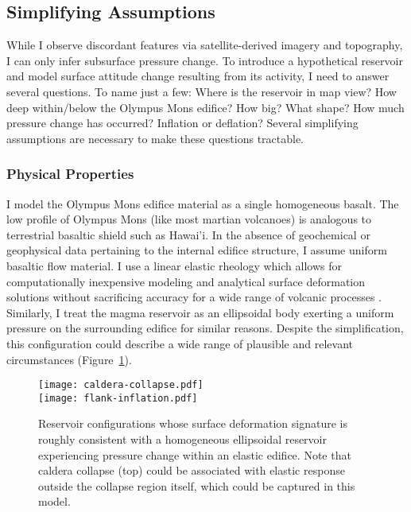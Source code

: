 \subsection{Simplifying Assumptions}

While I observe discordant features via satellite-derived imagery and topography, I can only infer subsurface pressure change. To introduce a hypothetical reservoir and model surface attitude change resulting from its activity, I need to answer several questions. To name just a few: Where is the reservoir in map view? How deep within/below the Olympus Mons edifice? How big? What shape? How much pressure change has occurred? Inflation or deflation? Several simplifying assumptions are necessary to make these questions tractable.

\subsubsection{Physical Properties}

I model the Olympus Mons edifice material as a single homogeneous basalt. The low profile of Olympus Mons (like most martian volcanoes) is analogous to terrestrial basaltic shield such as Hawai'i. In the absence of geochemical or geophysical data pertaining to the internal edifice structure, I assume uniform basaltic flow material. I use a linear elastic rheology which allows for computationally inexpensive modeling and analytical surface deformation solutions \parencite{mogi_relations_1958} without sacrificing accuracy for a wide range of volcanic processes \parencite{grosfils_elastic_2015}. Similarly, I treat the magma reservoir as an ellipsoidal body exerting a uniform pressure on the surrounding edifice for similar reasons. Despite the simplification, this configuration could describe a wide range of plausible and relevant circumstances (Figure~\ref{fig:reservoir-configs}).

\begin{figure}
    \texttt{[image: caldera-collapse.pdf]}\\
    \vspace{2cm}
    \texttt{[image: flank-inflation.pdf]}
    \caption[Ellipsoidal reservoir configurations]{Reservoir configurations whose surface deformation signature is roughly consistent with a homogeneous ellipsoidal reservoir experiencing pressure change within an elastic edifice. Note that caldera collapse (top) could be associated with elastic response outside the collapse region itself, which could be captured in this model.}
    \label{fig:reservoir-configs}
\end{figure}

